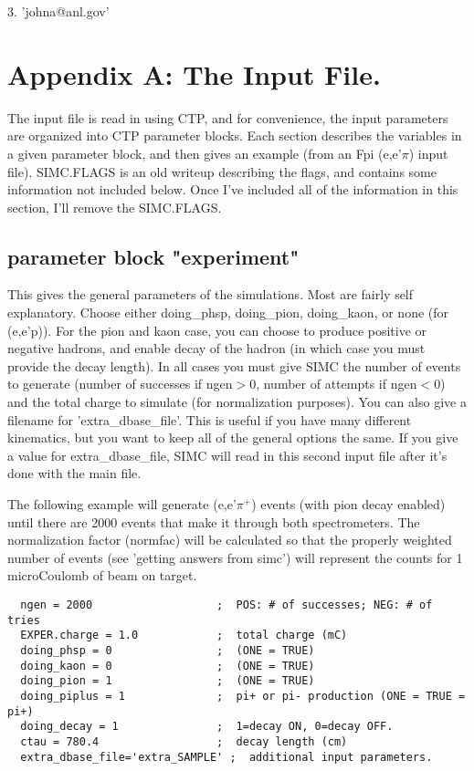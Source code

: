 3. 'johna@anl.gov'

\section{Appendix A: The Input File.}

The input file is read in using CTP, and for convenience, the input parameters
are organized into CTP parameter blocks.  Each section describes the variables
in a given parameter block, and then gives an example (from an Fpi (e,e'$\pi$)
input file).  SIMC.FLAGS is an old writeup describing the flags, and contains
some information not included below.  Once I've included all of the information
in this section, I'll remove the SIMC.FLAGS.


\subsection{parameter block "experiment"}
This gives the general parameters of the simulations.  Most are fairly
self explanatory.  Choose either doing\_phsp, doing\_pion, doing\_kaon, or
none (for (e,e'p)).  For the pion and kaon case, you can choose to produce
positive or negative hadrons, and enable decay of the hadron (in which case
you must provide the decay length).  In all cases you must give SIMC the
number of events to generate (number of successes if ngen$>$0, number of
attempts if ngen$<$0) and the total charge to simulate (for normalization
purposes).  You can also give a filename for 'extra\_dbase\_file'.  This
is useful if you have many different kinematics, but you want to keep
all of the general options the same.  If you give a value for extra\_dbase\_file,
SIMC will read in this second input file after it's done with the main file.

The following example will generate (e,e'$\pi^+$) events (with pion decay
enabled) until there are 2000 events that make it through both spectrometers.
The normalization factor (normfac) will be calculated so that the properly
weighted number of events (see 'getting answers from simc') will represent the
counts for 1 microCoulomb of beam on target.

\begin{verbatim}
  ngen = 2000                   ;  POS: # of successes; NEG: # of tries
  EXPER.charge = 1.0            ;  total charge (mC)
  doing_phsp = 0                ;  (ONE = TRUE)
  doing_kaon = 0                ;  (ONE = TRUE)
  doing_pion = 1                ;  (ONE = TRUE)
  doing_piplus = 1              ;  pi+ or pi- production (ONE = TRUE = pi+)
  doing_decay = 1               ;  1=decay ON, 0=decay OFF.
  ctau = 780.4                  ;  decay length (cm)
  extra_dbase_file='extra_SAMPLE' ;  additional input parameters.
\end{verbatim}


